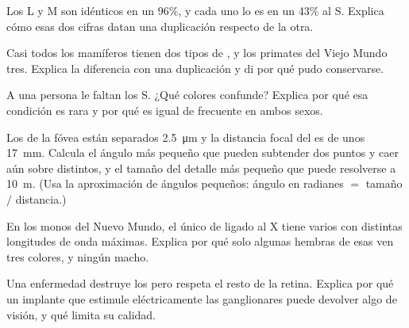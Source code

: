 \begin{exercise}[$\star\star$]\label{exo:g11:the-eye:10}
Los  L y M son idénticos en un 96\%, y cada uno lo es en un 43\%
al S. Explica cómo esas dos cifras datan una duplicación respecto de la
otra.
\end{exercise}

\begin{exercise}[$\star\star$]\label{exo:g11:the-eye:11}
Casi todos los mamíferos tienen dos tipos de , y los primates del
Viejo Mundo tres. Explica la diferencia con una duplicación y di por
qué pudo conservarse.
\end{exercise}

\begin{exercise}[$\star\star\star$]\label{exo:g11:the-eye:12}
A una persona le faltan los  S. ¿Qué colores confunde? Explica por
qué esa condición es rara y por qué es igual de frecuente en ambos
sexos.
\end{exercise}

\begin{exercise}[$\star\star\star$]\label{exo:g11:the-eye:13}
Los  de la fóvea están separados \qty{2.5}{\micro m} y la
distancia focal del  es de unos \qty{17}{mm}. Calcula el ángulo más
pequeño que pueden subtender dos puntos y caer aún sobre 
distintos, y el tamaño del detalle más pequeño que puede resolverse a
\qty{10}{m}. (Usa la aproximación de ángulos pequeños: ángulo en
radianes $=$ tamaño $/$ distancia.)
\end{exercise}

\begin{exercise}[$\star\star\star$]\label{exo:g11:the-eye:14}
En los monos del Nuevo Mundo, el único  de  ligado al X tiene
varios  con distintas longitudes de onda máximas. Explica por qué
solo algunas hembras de esas  ven tres colores, y ningún macho.
\end{exercise}

\begin{exercise}[$\star\star\star$]\label{exo:g11:the-eye:15}
Una enfermedad destruye los  pero respeta el resto de la
retina. Explica por qué un implante que estimule eléctricamente las
 ganglionares puede devolver algo de visión, y qué limita su
calidad.
\end{exercise}

